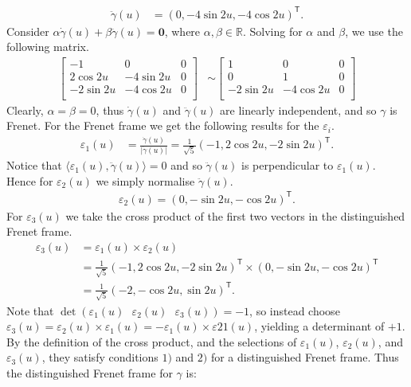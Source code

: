 \documentclass[a4paper]{article}
\newcommand{\ip}[2]{\langle #1, #2 \rangle}
\newcommand{\dotg}{\dot{\gamma}(u)}
\newcommand{\ddotg}{\ddot{\gamma}(u)}
\newcommand{\ds}{\displaystyle}
\begin{document}
\begin{enumerate}[leftmargin=*]
\begin{align*}
		\ddot{\gamma}(u) & = (0, -4\sin{2u}, -4\cos{2u})^\mathsf{T}.
	\end{align*}
	Consider $\ds{\alpha \dotg + \beta \ddotg = \mathbf{0}}$, where $\ds{\alpha,\beta \in \mathbb{R}}$. Solving for $\ds{\alpha}$ and $\ds{\beta}$, we use the following matrix.
	\begin{align*}\left[
	\begin{array}{cc|c}
		-1 & 0 & 0\\
		2\cos2u & -4\sin2u & 0 \\
		-2\sin2u & -4\cos2u & 0 \\
	\end{array}
	\right]
	& \sim \left[
	\begin{array}{cc|c}
		1 & 0 & 0\\
		0 & 1 & 0 \\
		-2\sin2u & -4\cos2u & 0 \\
	\end{array}
	\right]
	\end{align*}
	Clearly, $\ds{\alpha = \beta = 0}$, thus $\ds{\dotg}$ and $\ds{\ddotg}$ are linearly independent, and so $\ds{\gamma}$ is Frenet. For the Frenet frame we get the following results for the $\ds{\varepsilon_i}$.
	\begin{align*}
		\varepsilon_1(u) & = \frac{\dot{\gamma}(u)}{|\dot{\gamma}(u)|} = \frac{1}{\sqrt{5}}(-1, 2\cos{2u}, -2\sin{2u})^\mathsf{T}.
	\end{align*}
	Notice that $\ds{\ip{\varepsilon_1(u)}{\ddot{\gamma}(u)} = 0}$ and so $\ds{\ddot{\gamma}(u)}$ is perpendicular to $\ds{\varepsilon_1(u)}$. Hence for $\ds{\varepsilon_2(u)}$ we simply normalise $\ds{\ddot{\gamma}(u)}$.
	\begin{align*}
	\varepsilon_2(u) = (0, -\sin{2u}, -\cos{2u})^{\mathsf{T}}.
	\end{align*}
	For $\ds{\varepsilon_3(u)}$ we take the cross product of the first two vectors in the distinguished Frenet frame.
	\begin{align*}
		\varepsilon_3(u) & = \varepsilon_1(u) \times \varepsilon_2(u) \\
						 & = \frac{1}{\sqrt{5}}(-1, 2\cos{2u}, -2\sin{2u})^\mathsf{T} \times (0, -\sin{2u}, -\cos{2u})^{\mathsf{T}} \\
						 & = \frac{1}{\sqrt{5}}(-2, -\cos{2u}, \sin{2u})^\mathsf{T}.
	\end{align*}
	Note that $\ds{\det(\varepsilon_1(u) \:\:\: \varepsilon_2(u) \:\:\: \varepsilon_3(u)) = -1}$, so instead choose $\ds{\varepsilon_3(u) = \varepsilon_2(u) \times \varepsilon_1(u) = -\varepsilon_1(u) \times \varepsilon21(u)}$, yielding a determinant of $\ds{+1}$. By the definition of the cross product, and the selections of $\ds{\varepsilon_1(u)}$, $\ds{\varepsilon_2(u)}$, and $\ds{\varepsilon_3(u)}$, they satisfy conditions $\ds{1)}$ and $\ds{2)}$ for a distinguished Frenet frame. Thus the distinguished Frenet frame for $\ds{\gamma}$ is:

\end{enumerate}
\end{document}

